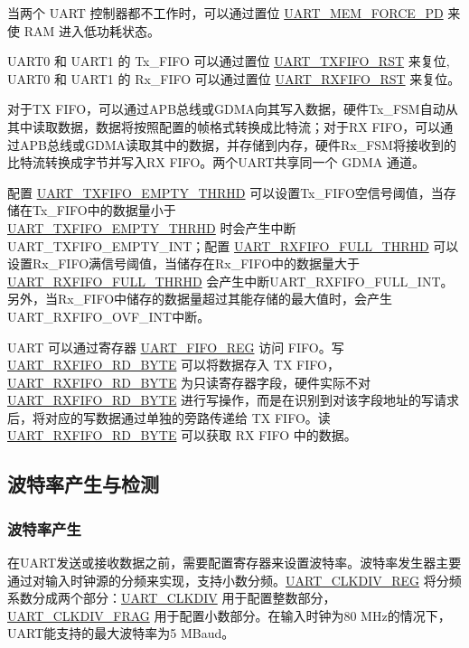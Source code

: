 \documentclass[main\_\_CN.tex]{subfiles}
\begin{document}
当两个 UART 控制器都不工作时，可以通过置位 \hyperref[fielddesc:UARTMEMFORCEPD]{UART\_MEM\_FORCE\_PD} 来使 RAM 进入低功耗状态。

UART0 和 UART1 的 Tx\_FIFO 可以通过置位 \hyperref[fielddesc:UARTTXFIFORST]{UART\_TXFIFO\_RST} 来复位, UART0 和 UART1 的 Rx\_FIFO 可以通过置位 \hyperref[fielddesc:UARTRXFIFORST]{UART\_RXFIFO\_RST} 来复位。

对于TX FIFO，可以通过APB总线或GDMA向其写入数据，硬件Tx\_FSM自动从其中读取数据，数据将按照配置的帧格式转换成比特流；对于RX FIFO，可以通过APB总线或GDMA读取其中的数据，并存储到内存，硬件Rx\_FSM将接收到的比特流转换成字节并写入RX FIFO。两个UART共享同一个 GDMA 通道。

配置 \hyperref[fielddesc:UARTTXFIFOEMPTYTHRHD]{UART\_TXFIFO\_EMPTY\_THRHD} 可以设置Tx\_FIFO空信号阈值，当存储在Tx\_FIFO中的数据量小于 \\\hyperref[fielddesc:UARTTXFIFOEMPTYTHRHD]{UART\_TXFIFO\_EMPTY\_THRHD} 时会产生中断UART\_TXFIFO\_EMPTY\_INT；配置 \hyperref[fielddesc:UARTRXFIFOFULLTHRHD]{UART\_RXFIFO\_FULL\_THRHD} 可以设置Rx\_FIFO满信号阈值，当储存在Rx\_FIFO中的数据量大于 \hyperref[fielddesc:UARTRXFIFOFULLTHRHD]{UART\_RXFIFO\_FULL\_THRHD} 会产生中断UART\_RXFIFO\_FULL\_INT。另外，当Rx\_FIFO中储存的数据量超过其能存储的最大值时，会产生UART\_RXFIFO\_OVF\_INT中断。

UART 可以通过寄存器 \hyperref[regdesc:UARTFIFOREG]{UART\_FIFO\_REG} 访问 FIFO。写 \hyperref[fielddesc:UARTRXFIFORDBYTE]{UART\_RXFIFO\_RD\_BYTE} 可以将数据存入 TX FIFO，\hyperref[fielddesc:UARTRXFIFORDBYTE]{UART\_RXFIFO\_RD\_BYTE} 为只读寄存器字段，硬件实际不对 \hyperref[fielddesc:UARTRXFIFORDBYTE]{UART\_RXFIFO\_RD\_BYTE} 进行写操作，而是在识别到对该字段地址的写请求后，将对应的写数据通过单独的旁路传递给 TX FIFO。读 \hyperref[fielddesc:UARTRXFIFORDBYTE]{UART\_RXFIFO\_RD\_BYTE} 可以获取 RX FIFO 中的数据。

\subsection{波特率产生与检测}

\subsubsection{波特率产生}

在UART发送或接收数据之前，需要配置寄存器来设置波特率。波特率发生器主要通过对输入时钟源的分频来实现，支持小数分频。\hyperref[regdesc:UARTCLKDIVREG]{UART\_CLKDIV\_REG} 将分频系数分成两个部分：\hyperref[fielddesc:UARTCLKDIV]{UART\_CLKDIV} 用于配置整数部分，\hyperref[fielddesc:UARTCLKDIVFRAG]{UART\_CLKDIV\_FRAG} 用于配置小数部分。在输入时钟为80 MHz的情况下，UART能支持的最大波特率为5 MBaud。
\end{document}
